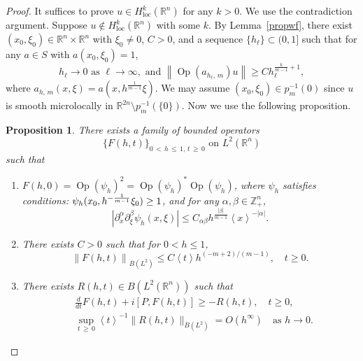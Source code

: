 \documentclass[10pt]{amsart}
\newtheorem{prop}[cdrthm]{Proposition}
\theoremstyle{definition}
\renewcommand*\a{\alpha}
\renewcommand*\b{\beta}
\newcommand*\g{\psi}
\newcommand*\x{\xi}
\DeclareMathOperator{\Op}{Op}
\newcommand*\re{\mathbb{R}}
\newcommand*\ze{\mathbb{Z}}
\newcommand*\pa{\partial}
\DeclareMathOperator{\loc}{loc}
\newcommand{\jap}[1]{\left\langle #1 \right\rangle}
\begin{document}
\begin{proof}
It suffices to prove $u\in H^k_{\loc}(\re^n)$ for any $k>0$. We use the contradiction argument. Suppose $u\notin H_{\loc}^{k}(\re^n)$ with some $k$. By Lemma~\ref{propwf}, there exist $(x_0, \x_0)\in \re^n \times \re^n$ with $\x_0 \ne 0$, $C>0$, and a sequence $\{h_\ell\}\subset (0, 1]$ such that for any $a\in S$ with $a(x_0, \x_0) = 1 $,
\[
h_{\ell} \to 0 \text{ as } \ell \to \infty, \text{ and }\left\| \Op(a_{h_{\ell},\,m})u\right\| \geq Ch_{\ell}^{\frac{k}{m-1}+1},
\]
where $a_{h,\,m}(x,\x)=a(x,h^{\frac{1}{m-1}}\x)$. We may assume $(x_0,\x_0) \in p_m^{-1}(0)$ since $u$ is smooth microlocally in $\re^{2n}\setminus p_m^{-1}(\{0\})$. Now we use the following proposition.


\begin{prop}\label{singprop}
There exists a family of bounded operators
\[
\{F(h,t)\}_{0\,<\,h\,\leq\,1,\,t\,\geq\,0}\text{ on }L^2(\re^n)
\]
such that
\begin{enumerate}
\item $F(h,0)=\Op(\g_{h})^2=\Op(\g_h)^*\Op(\g_h)$, where $\g_h$ satisfies conditions: $\g_h(x_0,\linebreak h^{-\frac{1}{m-1}}\x_0)\geq 1$, and for any $\a,\b\in\ze_+^n$,
\[
\left|\pa_{x}^{\a}\pa_{\x}^{\b}\g_{h}(x,\x)\right|\leq C_{\a\b}h^{\frac{|\b|}{m-1}}\jap{x}^{-|\a|}.
\]
\item There exists $C>0$ such that for $0<h\leq 1$,
\[
\left\|F(h,t)\right\|_{B(L^2)}\leq C\jap{t}h^{(-m+2)/(m-1)}, \quad t\geq 0.
\]
\item There exists $R(h,t)\in B(L^2(\re^n))$ such that
\begin{align*}
&\frac{d}{dt}F(h,t)+i[P,F(h,t)]\geq -R(h,t),\quad t\geq 0, \\
& \sup_{t\,\geq\,0}\jap{t}^{-1}\|R(h,t)\|_{B(L^2)}=O(h^{\infty})
\quad\text{as }h\to 0.
\end{align*}
\end{enumerate}
\end{prop}



\end{proof}
\end{document}
